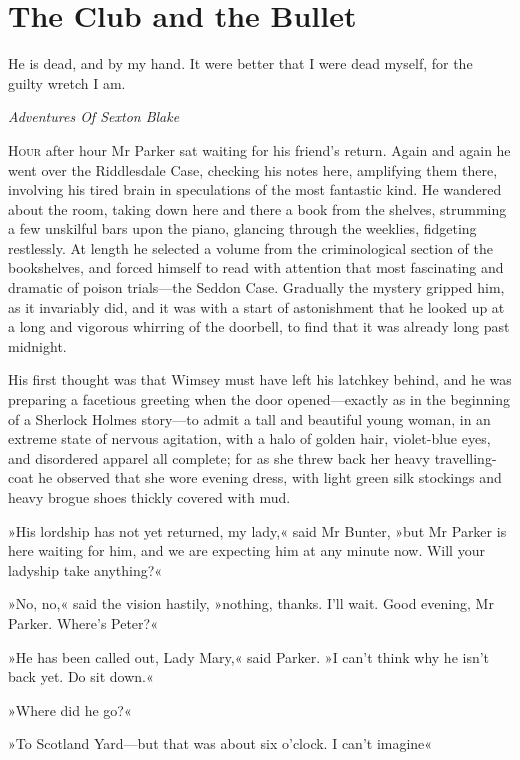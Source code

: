 


\chapter{The Club and the Bullet}

\epigraph{He is dead, and by my hand. It were better that I were dead myself, for the guilty wretch I am.}{\textit{Adventures Of Sexton Blake}}


\lettrine[lines=4]{H}{our} after hour Mr Parker sat waiting for his friend's return. Again and again he went over the Riddlesdale Case, checking his notes here, amplifying them there, involving his tired brain in speculations of the most fantastic kind. He wandered about the room, taking down here and there a book from the shelves, strumming a few unskilful bars upon the piano, glancing through the weeklies, fidgeting restlessly.  At length he selected a volume from the criminological section of the bookshelves, and forced himself to read with attention that most fascinating and dramatic of poison trials—the Seddon Case. Gradually the mystery gripped him, as it invariably did, and it was with a start of astonishment that he looked up at a long and vigorous whirring of the doorbell, to find that it was already long past midnight.

His first thought was that Wimsey must have left his latchkey behind, and he was preparing a facetious greeting when the door opened—exactly as in the beginning of a Sherlock Holmes story—to admit a tall and beautiful young woman, in an extreme state of nervous agitation, with a halo of golden hair, violet-blue eyes, and disordered apparel all complete; for as she threw back her heavy travelling-coat he observed that she wore evening dress, with light green silk stockings and heavy brogue shoes thickly covered with mud.

»His lordship has not yet returned, my lady,« said Mr Bunter, »but Mr  Parker is here waiting for him, and we are expecting him at any minute now. Will your ladyship take anything?«

»No, no,« said the vision hastily, »nothing, thanks. I'll wait. Good evening, Mr Parker. Where's Peter?«

»He has been called out, Lady Mary,« said Parker. »I can't think why he isn't back yet. Do sit down.«

»Where did he go?«

»To Scotland Yard—but that was about six o'clock. I can't imagine\longdash«


